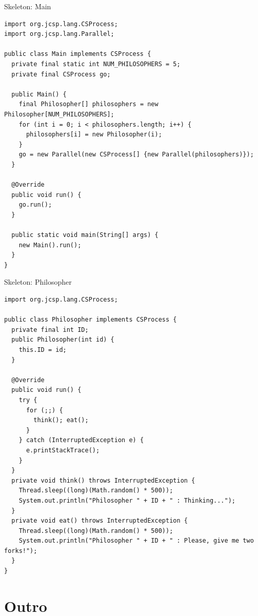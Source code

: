 \begin{frame}[fragile]{Skeleton: Main}
\begin{lstlisting}[basicstyle=\fontsize{7}{9}\selectfont\ttfamily]
import org.jcsp.lang.CSProcess;
import org.jcsp.lang.Parallel;

public class Main implements CSProcess {
  private final static int NUM_PHILOSOPHERS = 5;
  private final CSProcess go;

  public Main() {
    final Philosopher[] philosophers = new Philosopher[NUM_PHILOSOPHERS];
    for (int i = 0; i < philosophers.length; i++) {
      philosophers[i] = new Philosopher(i);
    }
    go = new Parallel(new CSProcess[] {new Parallel(philosophers)});
  }

  @Override
  public void run() {
    go.run();
  }

  public static void main(String[] args) {
    new Main().run();
  }
}
\end{lstlisting}
\end{frame}

\begin{frame}[fragile]{Skeleton: Philosopher}
\begin{lstlisting}[basicstyle=\fontsize{6}{8}\selectfont\ttfamily]
import org.jcsp.lang.CSProcess;

public class Philosopher implements CSProcess {
  private final int ID;
  public Philosopher(int id) {
    this.ID = id;
  }

  @Override
  public void run() {
    try {
      for (;;) {
        think(); eat();      
      }
    } catch (InterruptedException e) {
      e.printStackTrace();
    }
  }
  private void think() throws InterruptedException { 
    Thread.sleep((long)(Math.random() * 500));
    System.out.println("Philosopher " + ID + " : Thinking...");
  }
  private void eat() throws InterruptedException {
    Thread.sleep((long)(Math.random() * 500));
    System.out.println("Philosopher " + ID + " : Please, give me two forks!");
  }
}
\end{lstlisting}
\end{frame}


\section*{Outro}

